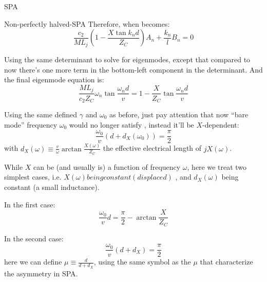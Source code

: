 \documentclass[12pt,a4paper]{article}
\begin{document}
\begin{section}{SPA}
\begin{subsection}{Non-perfectly halved-SPA}
Therefore, when  becomes: 
\begin{equation}\label{eq:2'}
\frac{c_2}{M L_j}\left( 1 - \frac{X \tan{k_n d}}{Z_C}\right)A_n + \frac{k_n}{l}B_n = 0
\end{equation}

Using the same determinant to solve for eigenmodes, except that compared to now there's one more term in the bottom-left component in the determinant. And the final eigenmode equation is: 
\begin{equation}\label{eq:real}
\frac{M L_j}{c_2 Z_C}\omega_n\tan{\frac{\omega_n d}{v}} = 1 - \frac{X}{Z_C} \tan{\frac{\omega_n d}{v}}
\end{equation}

Using the same defined $\gamma$ and $\omega_0$ as  before, just pay attention that now ``bare mode'' frequency $\omega_0$ would no longer satisfy , instead it'll be $X$-dependent: 
\begin{equation}
\frac{\omega_0}{v}(d+d_X(\omega_0)) = \frac{\pi}{2}
\end{equation}
with $d_X(\omega) \equiv \frac{v}{\omega} \arctan{\frac{X(\omega)}{Z_C}}$ the effective electrical length of $jX(\omega)$. 

While $X$ can be (and usually is) a function of frequency $\omega$, here we treat two simplest cases, i.e. $X(\omega) being constant (displaced)$ , and $d_X(\omega)$ being constant (a small inductance). 

In the first case: 
\begin{equation}\label{eq:f0_1}
\frac{\omega_0}{v}d = \frac{\pi}{2} - \arctan{\frac{X}{Z_C}}
\end{equation}

In the second case: 
\begin{equation}\label{eq:f0_2}
\frac{\omega_0}{v}(d + d_X) = \frac{\pi}{2}
\end{equation}
here we can define $\mu \equiv \frac{d}{d+d_X}$, using the same symbol as the $\mu$ that characterize the asymmetry in SPA. 


\end{subsection}
\end{section}
\end{document}
